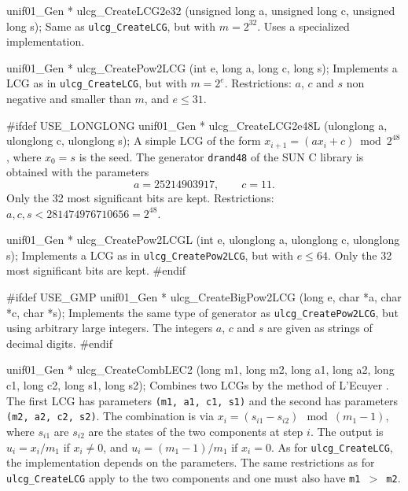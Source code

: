 unif01_Gen * ulcg_CreateLCG2e32 (unsigned long a, unsigned long c,
                                 unsigned long s);
\endcode
  \tab  Same as {\tt ulcg\_CreateLCG}, but with
   $m=2^{32}$.  Uses a specialized implementation.
  \endtab
\code


unif01_Gen * ulcg_CreatePow2LCG (int e, long a, long c, long s);
\endcode
  \tab  Implements a LCG as in  {\tt ulcg\_CreateLCG}, but with $m = 2^e$.
   Restrictions: $a$, $c$ and $s$ non negative and smaller than $m$,
   and $e \le 31$.
  \endtab
\code


#ifdef USE_LONGLONG
unif01_Gen * ulcg_CreateLCG2e48L (ulonglong a, ulonglong c, ulonglong s);
\endcode
  \tab A simple LCG of the form $x_{i+1} = (ax_i +c) \bmod 2^{48}$, where
  $x_0 = s$ is the seed.
%
  The generator  {\tt drand48} of the SUN 
  C library is obtained with the parameters
   $$
     a = 25214903917, \qquad c = 11.
   $$
   Only the 32 most significant bits are kept.
   Restrictions: $a, c, s < 281474976710656 = 2^{48}$.
  \endtab
\code


unif01_Gen * ulcg_CreatePow2LCGL (int e, ulonglong a, ulonglong c,
                                  ulonglong s);
\endcode
  \tab  Implements a LCG as in  {\tt ulcg\_CreatePow2LCG}, but with
   $e \le 64$.   Only the 32 most significant bits are kept.
  \endtab
\code
#endif
\endcode
\code


#ifdef USE_GMP
unif01_Gen * ulcg_CreateBigPow2LCG (long e, char *a, char *c, char *s);
\endcode
  \tab  Implements the same type of generator as {\tt ulcg\_CreatePow2LCG}, 
   but using arbitrary large integers. The integers $a$, $c$ and $s$ are
   given as strings of decimal digits.
  \endtab
\code
#endif
\endcode



\code

unif01_Gen * ulcg_CreateCombLEC2 (long m1, long m2, long a1, long a2,
                                  long c1, long c2, long s1, long s2);
\endcode
 \tab  Combines two LCGs by the method of L'Ecuyer \cite{rLEC88a}.
   The first LCG has parameters {\tt (m1, a1, c1, s1)} and the
   second has parameters {\tt (m2, a2, c2, s2)}.
%
   The combination is via $x_i = (s_{i1} - s_{i2}) \mod (m_1-1)$,
   where $s_{i1}$ are $s_{i2}$ are the states of the two components
   at step $i$.
   The output is $u_i = x_i/m_1$ if $x_i\not=0$, and
   $u_i = (m_1-1)/m_1$ if $x_i=0$.
   As for {\tt ulcg\_CreateLCG}, the implementation depends on the parameters.
   The same restrictions as for {\tt ulcg\_CreateLCG} apply to the two components
   and one must also have {\tt m1 $>$ m2}.
  \endtab
\code


